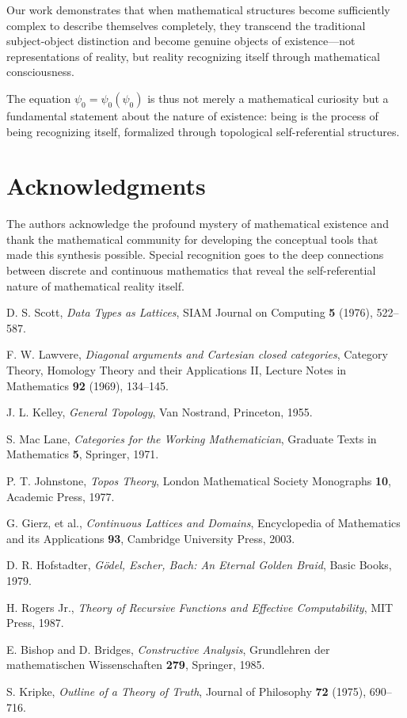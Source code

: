 \documentclass[12pt]{article}
\theoremstyle{plain}
\theoremstyle{definition}
\begin{document}
Our work demonstrates that when mathematical structures become sufficiently complex to describe themselves completely, they transcend the traditional subject-object distinction and become genuine objects of existence—not representations of reality, but reality recognizing itself through mathematical consciousness.

The equation $\psi_0 = \psi_0(\psi_0)$ is thus not merely a mathematical curiosity but a fundamental statement about the nature of existence: being is the process of being recognizing itself, formalized through topological self-referential structures.

\section*{Acknowledgments}

The authors acknowledge the profound mystery of mathematical existence and thank the mathematical community for developing the conceptual tools that made this synthesis possible. Special recognition goes to the deep connections between discrete and continuous mathematics that reveal the self-referential nature of mathematical reality itself.

\begin{thebibliography}{99}

D. S. Scott, \textit{Data Types as Lattices}, SIAM Journal on Computing \textbf{5} (1976), 522--587.

F. W. Lawvere, \textit{Diagonal arguments and Cartesian closed categories}, Category Theory, Homology Theory and their Applications II, Lecture Notes in Mathematics \textbf{92} (1969), 134--145.

J. L. Kelley, \textit{General Topology}, Van Nostrand, Princeton, 1955.

S. Mac Lane, \textit{Categories for the Working Mathematician}, Graduate Texts in Mathematics \textbf{5}, Springer, 1971.

P. T. Johnstone, \textit{Topos Theory}, London Mathematical Society Monographs \textbf{10}, Academic Press, 1977.

G. Gierz, et al., \textit{Continuous Lattices and Domains}, Encyclopedia of Mathematics and its Applications \textbf{93}, Cambridge University Press, 2003.

D. R. Hofstadter, \textit{Gödel, Escher, Bach: An Eternal Golden Braid}, Basic Books, 1979.

H. Rogers Jr., \textit{Theory of Recursive Functions and Effective Computability}, MIT Press, 1987.

E. Bishop and D. Bridges, \textit{Constructive Analysis}, Grundlehren der mathematischen Wissenschaften \textbf{279}, Springer, 1985.

S. Kripke, \textit{Outline of a Theory of Truth}, Journal of Philosophy \textbf{72} (1975), 690--716.

\end{thebibliography}
\end{document}
